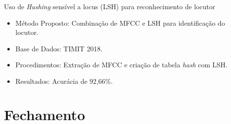 \documentclass{beamer}
\begin{document}
	\begin{frame}{Uso de \textit{Hashing} sensível a locus (LSH) para reconhecimento de locutor \cite{8396208}}
		\begin{itemize}
			\item Método Proposto: Combinação de MFCC e LSH para identificação do locutor.
			\item Base de Dados: TIMIT 2018.
			\item Procedimentos: Extração de MFCC e criação de tabela \textit{hash} com LSH.
			\item Resultados: Acurácia de 92,66\%.
		\end{itemize}
		
	\end{frame}

	\section{Fechamento}
\end{document}
